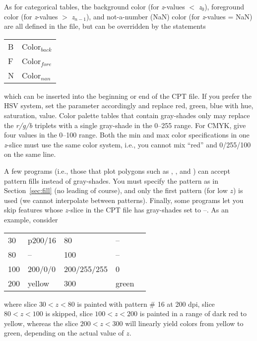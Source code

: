 As for categorical tables, the background color (for \emph{z}-values $<$ \emph{z$_0$}), foreground color
(for \emph{z}-values $>$ \emph{z$_{n-1}$}), and not-a-number (NaN) color (for
\emph{z}-values = NaN) are all defined in the 
file, but can be overridden by the statements

\begin{center}
\begin{tabular}{ll}
B &  Color$_{back}$ \\ 
F &  Color$_{fore}$ \\ 
N &  Color$_{nan}$ \\
\end{tabular}
\end{center}

\noindent
which can be inserted into the beginning or end of the CPT file.  If
you prefer the HSV system, set the
 parameter accordingly and replace red, green,
blue with hue, saturation, value.  Color palette tables that contain
gray-shades only may replace the \emph{r/g/b} triplets with a single gray-shade
in the 0--255 range.  For CMYK, give four values in the 0--100 range.
Both the min and max color specifications in one \emph{z}-slice must use
the same color system, i.e., you cannot mix ``red'' and 0/255/100 on the
same line.

A few programs (i.e., those that plot polygons such as ,
,  and ) can accept pattern fills instead
of gray-shades.  You must specify the pattern as in Section~\ref{sec:fill} (no
leading  of course), and only the first pattern (for low $z$) is used (we cannot
interpolate between patterns).  
Finally, some programs let you skip features whose $z$-slice in the CPT file has
gray-shades set to --.  As an example, consider

\begin{center}
\begin{tabular}{lllll}
30 &  p200/16 &  80 & -- \\ 
80 &  -- &  100 &  -- \\
100 &  200/0/0  &  200/255/255  &  0 \\
200 &  yellow &  300 & green  \\ 
\end{tabular} 
\end{center}
\noindent
where slice $30 < z < 80$ is painted with pattern \# 16 at 200 dpi,
slice $80 < z < 100$ is skipped, slice $100 < z < 200$ is
painted in a range of dark red to yellow, whereas the slice $200 < z < 300$
will linearly yield colors from yellow to green, depending on the actual value
of $z$.


